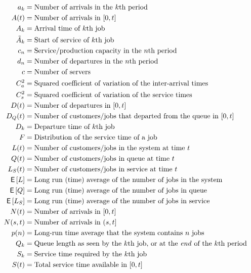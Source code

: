 \begin{align*}
  a_k &= \text{Number of arrivals in the $k$th period} \\
  A(t) &= \text{Number of arrivals in $[0,t]$} \\
  A_k &= \text{Arrival time of $k$th job} \\
  \tilde A_{k} &= \text{Start of service of $k$th job} \\
  c_n &= \text{Service/production capacity in the $n$th period} \\
  d_n &= \text{Number of departures in the $n$th period} \\
  c &= \text{Number of servers} \\
  C_a^2 &= \text{Squared coefficient of variation of the inter-arrival times} \\
  C_s^2 &= \text{Squared coefficient of variation of the service times} \\
  D(t) &= \text{Number of departures in $[0,t]$} \\
  D_Q(t) &= \text{Number of customers/jobs that departed from the queue in $[0,t]$} \\
  D_k &= \text{Departure time of $k$th job} \\
  F &= \text{Distribution of the service time of a job} \\
  L(t) &= \text{Number of customers/jobs in the system at time $t$} \\
  Q(t) &= \text{Number of customers/jobs in queue at time $t$} \\
  L_S(t) &= \text{Number of customers/jobs in service at time $t$} \\
  \E L &= \text{Long run (time) average of the number of jobs in the system} \\
  \E Q &= \text{Long run (time) average of the number of jobs in queue} \\
  \E{L_S} &= \text{Long run (time) average of the number of jobs in service} \\
  N(t) &= \text{Number of arrivals in $[0,t]$} \\
  N(s,t) &= \text{Number of arrivals in $(s,t]$} \\
  p(n)  &= \text{Long-run time average that the system contains $n$ jobs} \\
  Q_k &= \text{Queue length as seen by the $k$th job, or at the \textit{end} of the $k$th period} \\
  S_k &= \text{Service time required by the $k$th job} \\
  S(t) &= \text{Total service time available in $[0,t]$} \\

\end{align*}
